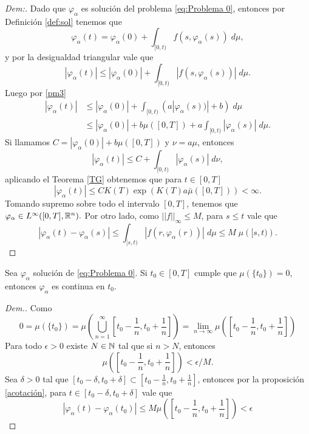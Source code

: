 \begin{proof}[Dem:]
 	Dado que $\varphi_{\alpha}$ es solución del problema \eqref{eq:Problema 0}, entonces por Definición  \ref{def:sol} tenemos que
 		$$\varphi_{\alpha}(t)=\varphi_{\alpha}(0)+\int_{[0,t)} f(s,\varphi_{\alpha}(s))\;d\mu,$$
 y por la desigualdad triangular vale que 
$$ 		|\varphi_{\alpha}(t)| \leq |\varphi_{\alpha}(0)|+\int_{[0,t)}| f(s,\varphi_{\alpha}(s))|\;d\mu.$$
Luego por \ref{pm3}
\begin{equation*}
\begin{split}
 	|\varphi_{\alpha}(t)| &\leq  |\varphi_{\alpha}(0)|+\int_{[0,t)}\left(a|\varphi_{\alpha}(s))|+b\right)\;d\mu\\	
     &\leq |\varphi_{\alpha}(0)|+b\mu([0,T])+a\int_{[0,t)}| \varphi_{\alpha}(s)|\;d\mu.
\end{split}
\end{equation*}
 Si llamamos $C=|\varphi_{\alpha}(0)|+b\mu([0,T])$ y $\nu=a\mu$, entonces
 $$|\varphi_{\alpha}(t)| \leq C+\int_{[0,t)}| \varphi_{\alpha}(s)|\;d\nu,$$
 aplicando el Teorema \ref{TG} obtenemos que para $t\in[0,T]$
 \begin{equation*}
 	|\varphi_{\alpha}(t)|\leq CK(T)\exp\left(K(T)a\bar{\mu}([0,T]) \right)  < \infty.
 \end{equation*}
Tomando supremo sobre todo el intervalo $[0,T]$, tenemos que\\
$\varphi_{\alpha}\in L^\infty([0,T],\mathbb{R}^n).$
Por otro lado, como $||f||_\infty \leq M$, para $s\leq t$ vale que
  	\begin{equation*}
  		|\varphi_\alpha(t)-\varphi_\alpha(s)|\leq \int_{[s,t)}|f(r,\varphi_\alpha(r))|\;d\mu\leq M\;\mu\left( [s,t) \right). 
  	\end{equation*}
  
\end{proof}
\begin{cor}\label{corolario_continuidad}
    Sea $\varphi_\alpha$ solución de  \eqref{eq:Problema 0}. Si $t_0\in [0,T]$ cumple que $\mu(\{t_0\})=0$,  entonces $\varphi_\alpha$ es continua en $t_0$.
\end{cor}

\begin{proof}[Dem.]
Como $$0=\mu\left(\{t_0\}\right)=\mu\left(\bigcup_{n=1}^{\infty}\left[t_0-\frac{1}{n},t_0+\frac{1}{n}\right]\right)=\lim_{n\to\infty}\mu\left(\left[t_0-\frac{1}{n},t_0+\frac{1}{n}\right]\right)$$    
Para todo $\epsilon>0$ existe $N\in\mathbb{N}$ tal que si $n>N$, entonces $$\mu\left(\left[t_0-\frac{1}{n},t_0+\frac{1}{n}\right]\right)<\epsilon/M.$$
Sea $\delta>0$ tal que  $\left[t_0-\delta,t_0+\delta\right]\subset\left[t_0-\frac{1}{n},t_0+\frac{1}{n}\right]$, entonces por la proposición \ref{acotación}, para $t\in \left[t_0-\delta,t_0+\delta\right]$ vale que
\begin{equation*}
    |\varphi_\alpha(t)-\varphi_\alpha(t_0)|\leq M\mu\left(\left[t_0-\frac{1}{n},t_0+\frac{1}{n}\right]\right)<\epsilon
\end{equation*}

\end{proof}




